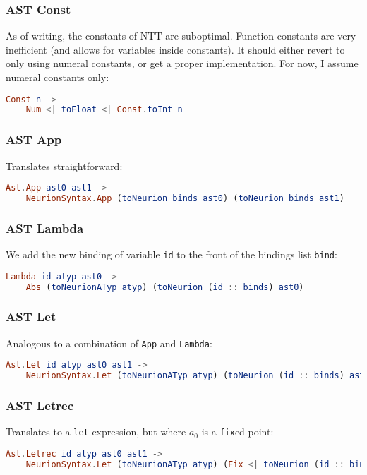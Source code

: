 \documentclass[10pt,a4paper,english]{article}
\begin{document}
\subsubsection*{AST Const}
As of writing, the constants of NTT are suboptimal. Function constants are very inefficient (and allows for variables inside constants). It should either revert to only using numeral constants, or get a proper implementation. For now, I assume numeral constants only:
\begin{lstlisting}[language=elm,%
                     label="eval-evaluated",%
                     gobble=0,%
                     ]
Const n ->
    Num <| toFloat <| Const.toInt n
\end{lstlisting}
\subsubsection*{AST App}
Translates straightforward:
\begin{lstlisting}[language=elm,%
                     label="eval-evaluated",%
                     gobble=0,%
                     ]
Ast.App ast0 ast1 ->
    NeurionSyntax.App (toNeurion binds ast0) (toNeurion binds ast1)
\end{lstlisting}
\subsubsection*{AST Lambda}
We add the new binding of variable \texttt{id} to the front of the bindings list \texttt{bind}:
\begin{lstlisting}[language=elm,%
                     label="eval-evaluated",%
                     gobble=0,%
                     ]
Lambda id atyp ast0 ->
    Abs (toNeurionATyp atyp) (toNeurion (id :: binds) ast0)
\end{lstlisting}
\subsubsection*{AST Let}
Analogous to a combination of \texttt{App} and \texttt{Lambda}:
\begin{lstlisting}[language=elm,%
                     label="eval-evaluated",%
                     gobble=0,%
                     ]
Ast.Let id atyp ast0 ast1 ->
    NeurionSyntax.Let (toNeurionATyp atyp) (toNeurion (id :: binds) ast0) (toNeurion (id :: binds) ast1)
\end{lstlisting}
\subsubsection*{AST Letrec}
Translates to a \texttt{let}-expression, but where $a_0$ is a \texttt{fix}ed-point:
\begin{lstlisting}[language=elm,%
                     label="eval-evaluated",%
                     gobble=0,%
                     ]
Ast.Letrec id atyp ast0 ast1 ->
    NeurionSyntax.Let (toNeurionATyp atyp) (Fix <| toNeurion (id :: binds) ast0) (toNeurion (id :: binds) ast1)
\end{lstlisting}
\end{document}
